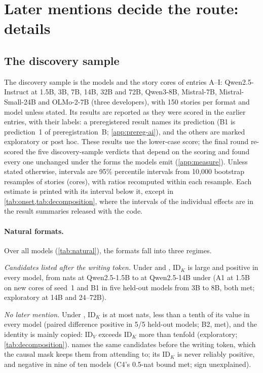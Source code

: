 \section{Later mentions decide the route: details}\label{app:claim1}

\subsection{The discovery sample}\label{app:discovery}\label{sec:read}\label{sec:mentions}\label{sec:general}\label{app:additional}

The discovery sample is the \nModels{} models and the story cores of entries A--I: Qwen2.5-Instruct at 1.5B, 3B, 7B, 14B, 32B and 72B, Qwen3-8B, Mistral-7B, Mistral-Small-24B and OLMo-2-7B (three developers), with 150 stories per format and model unless stated. Its results are reported as they were scored in the earlier entries, with their labels: a preregistered result names its prediction (B1 is prediction~1 of preregistration~B; \cref{app:prereg-ai}), and the others are marked exploratory or post hoc. These results use the lower-case score; the final round re-scored the five discovery-sample verdicts that depend on the scoring and found every one unchanged under the forms the models emit (\cref{app:measure}). Unless stated otherwise, intervals are 95\% percentile intervals from 10{,}000 bootstrap resamples of stories (cores), with ratios recomputed within each resample. Each estimate is printed with its interval below it, except in \cref{tab:onset,tab:decomposition}, where the intervals of the individual effects are in the result summaries released with the code.

\paragraph{Natural formats.}
Over all \nModels{} models (\cref{tab:natural}), the formats fall into three regimes.

\emph{Candidates listed after the writing token.} Under \fmtOpt{} and \fmtLetter{}, $\mathrm{ID}_K$ is large and positive in every model, from \idKOptQwenOnefive{} nats at Qwen2.5-1.5B to \idKOptQwenFourteen{} at Qwen2.5-14B under \fmtOpt{} (A1 at 1.5B on new cores of seed~1 and B1 in five held-out models from 3B to 8B, both met; exploratory at 14B and 24--72B).

\emph{No later mention.} Under \fmtNone{}, $\mathrm{ID}_K$ is at most \noneMax{} nats, less than a tenth of its \fmtOpt{} value in every model (paired difference positive in 5/5 held-out models; B2, met), and the identity is mainly copied: $\mathrm{ID}_V$ exceeds $\mathrm{ID}_K$ more than tenfold (exploratory; \cref{tab:decomposition}). \fmtBefore{} names the same candidates before the writing token, which the causal mask keeps them from attending to; its $\mathrm{ID}_K$ is never reliably positive, and negative in nine of ten models (C4's 0.5-nat bound met; sign unexplained).

